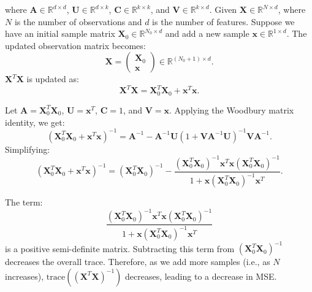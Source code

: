 \documentclass[11pt]{article}
\begin{document}
	where \(\mathbf{A} \in \mathbb{R}^{d \times d}\), \(\mathbf{U} \in \mathbb{R}^{d \times k}\), \(\mathbf{C} \in \mathbb{R}^{k \times k}\), and \(\mathbf{V} \in \mathbb{R}^{k \times d}\).
	Given \(\mathbf{X} \in \mathbb{R}^{N \times d}\), where \( N \) is the number of observations and \( d \) is the number of features.
	Suppose we have an initial sample matrix \(\mathbf{X}_0 \in \mathbb{R}^{N_0 \times d}\) and add a new sample \(\mathbf{x} \in \mathbb{R}^{1 \times d}\).
	The updated observation matrix becomes:
	\[
	\mathbf{X} = \begin{pmatrix}
	\mathbf{X}_0 \\
	\mathbf{x}
	\end{pmatrix} \in \mathbb{R}^{(N_0 + 1) \times d}.
	\]
	\(\mathbf{X}^T \mathbf{X}\) is updated as:
	\[
	\mathbf{X}^T \mathbf{X} = \mathbf{X}_0^T \mathbf{X}_0 + \mathbf{x}^T \mathbf{x}.
	\]

	Let \(\mathbf{A} = \mathbf{X}_0^T \mathbf{X}_0\), \(\mathbf{U} = \mathbf{x}^T\), \(\mathbf{C} = 1\), and \(\mathbf{V} = \mathbf{x}\).
	Applying the Woodbury matrix identity, we get:
	\[
	(\mathbf{X}_0^T \mathbf{X}_0 + \mathbf{x}^T \mathbf{x})^{-1} = \mathbf{A}^{-1} - \mathbf{A}^{-1} \mathbf{U} (1 + \mathbf{V} \mathbf{A}^{-1} \mathbf{U})^{-1} \mathbf{V} \mathbf{A}^{-1}.
	\]
	Simplifying:
	\[
	(\mathbf{X}_0^T \mathbf{X}_0 + \mathbf{x}^T \mathbf{x})^{-1} = (\mathbf{X}_0^T \mathbf{X}_0)^{-1} - \frac{(\mathbf{X}_0^T \mathbf{X}_0)^{-1} \mathbf{x}^T \mathbf{x} (\mathbf{X}_0^T \mathbf{X}_0)^{-1}}{1 + \mathbf{x} (\mathbf{X}_0^T \mathbf{X}_0)^{-1} \mathbf{x}^T}.
	\]

	The term:
	\[
	\frac{(\mathbf{X}_0^T \mathbf{X}_0)^{-1} \mathbf{x}^T \mathbf{x} (\mathbf{X}_0^T \mathbf{X}_0)^{-1}}{1 + \mathbf{x} (\mathbf{X}_0^T \mathbf{X}_0)^{-1} \mathbf{x}^T}
	\]
	is a positive semi-definite matrix. Subtracting this term from \((\mathbf{X}_0^T \mathbf{X}_0)^{-1}\) decreases the overall trace.
	Therefore, as we add more samples (i.e., as \( N \) increases), \(\text{trace}((\mathbf{X}^T \mathbf{X})^{-1})\) decreases, leading to a decrease in MSE.
\end{document}
